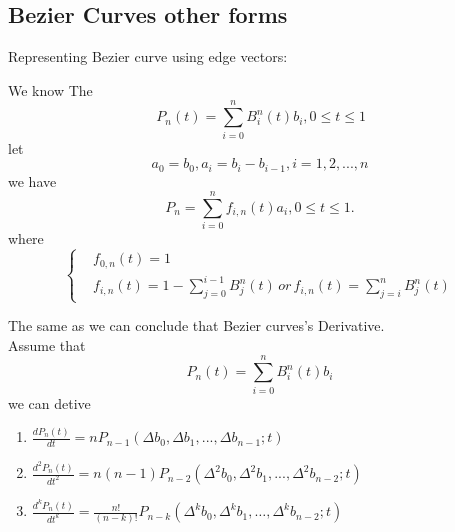 \subsection{Bezier Curves other forms}

Representing Bezier curve using edge vectors:
\begin{definition}
	We know The \[
		\,
		P_{n}(t) = \sum\limits_{i=0}^{n}B_{i}^{n}(t)b_{i},0\leq t \leq 1
	\]
	let \[
		a_{0} = b_{0},a_{i} = b_{i}-b_{i-1},i = 1,2,...,n
	\]
	we have \[
		P_{n} = \sum\limits_{i=0}^{n}f_{i,n}(t)a_{i},0\leq t \leq 1.
	\]
	where
	\begin{equation*}
		\begin{cases}
			 & f_{0,n}(t) = 1                                                                                           \\
			 & f_{i,n}(t) = 1 - \sum\limits_{j=0}^{i-1}B_{j}^{n}(t)\,or\, f_{i,n}(t)= \sum\limits_{j=i}^{n}B_{j}^{n}(t)
		\end{cases}
	\end{equation*}
	\label{def:bezier_curve_using_edge_vectors}
\end{definition}
\newpage
The same as we can conclude that Bezier curves's Derivative.\\
Assume that \[
	P_{n}(t) = \sum\limits_{i=0}^{n}B_{i}^{n}(t)b_{i}
\]
we can detive
\begin{enumerate}
	\item $\frac{dP_{n}(t)}{dt} = n P_{n-1}(\Delta b_{0},\Delta b_{1},...,\Delta b_{n-1};t)$
	\item $\frac{d^2P_{n}(t)}{dt^2} = n(n-1) P_{n-2}(\Delta^2 b_{0},\Delta^2 b_{1},...,\Delta^2 b_{n-2};t)$
	\item $\frac{d^kP_{n}(t)}{dt^k} = \frac{n!}{(n-k)!}P_{n-k}(\Delta^k b_{0},\Delta^k b_{1},\dots,\Delta^k b_{n-2};t)$
\end{enumerate}


